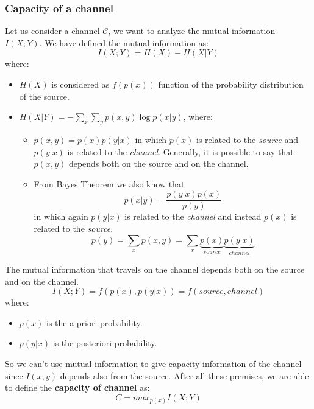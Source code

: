\subsubsection{Capacity of a channel}
Let us consider a channel $\mathcal{C}$, we want to analyze the mutual information $I(X;Y)$. We have defined the mutual information as:
$$I(X;Y) = H(X) - H(X|Y)$$
where:
\begin{itemize}
	\item $H(X)$ is considered as $f(p(x))$ function of the probability distribution of the source.
	\item $H(X|Y) = -\sum_x \sum_y p(x,y) \log{p(x|y)}$, where:
		\begin{itemize}
			\item $p(x,y) = p(x)p(y|x)$ in which $p(x)$ is related to the \textit{source} and $p(y|x)$ is related to the \textit{channel}. Generally, it is possible to say that $p(x,y)$ depends both on the source and on the channel.
			\item From Bayes Theorem we also know that $$p(x|y) = \frac{p(y|x) p(x)}{p(y)}$$ in which again $p(y|x)$ is related to the \textit{channel} and instead $p(x)$ is related to the \textit{source}.
			$$p(y) = \sum_x p(x,y) = \sum_x \underbrace{p(x)}_{source}\underbrace{p(y|x)}_{channel}$$
		\end{itemize} 
\end{itemize}
The mutual information that travels on the channel depends both on the source and on the channel.
$$I(X;Y) = f(p(x), p(y|x)) = f(source, channel)$$
where:
\begin{itemize}
	\item $p(x)$ is the a priori probability.
	\item $p(y|x)$ is the posteriori probability.
\end{itemize}
So we can't use mutual information to give capacity information of the channel since $I(x,y)$ depends also from the source.	
After all these premises, we are able to define the \textbf{capacity of channel} as:
$$C = max_{p(x)} I(X;Y)$$

